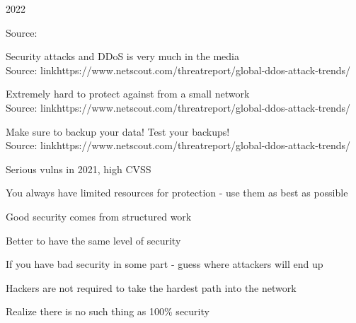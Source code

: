 \documentclass[Screen16to9,17pt]{foils}
\begin{document}
{2022}



Source: 






Security attacks and DDoS is very much in the media\\
Source: link{https://www.netscout.com/threatreport/global-ddos-attack-trends/}




Extremely hard to protect against from a small network\\
Source: link{https://www.netscout.com/threatreport/global-ddos-attack-trends/}





Make sure to backup your data! Test your backups!\\
Source: link{https://www.netscout.com/threatreport/global-ddos-attack-trends/}




Serious vulns in 2021, high CVSS





\begin{list1}
\item You always have limited resources for protection - use them as best as possible
\item Good security comes from structured work
\end{list1}




\begin{list1}
\item Better to have the same level of security
\item If you have bad security in some part - guess where attackers will end up
\item Hackers are not required to take the hardest path into the network
\item Realize there is no such thing as 100\% security
\end{list1}
\end{document}

